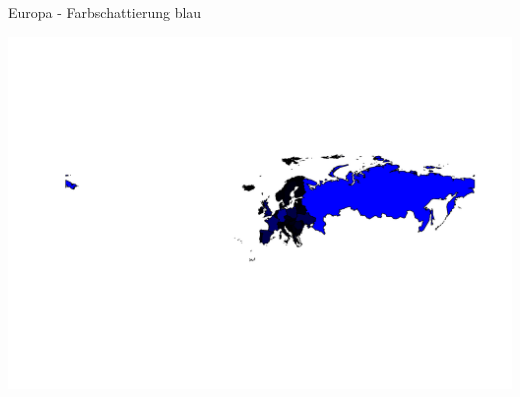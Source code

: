 \documentclass[ignorenonframetext,]{beamer}
\newenvironment{Shaded}{\begin{snugshade}}{\end{snugshade}}
\newcommand{\DataTypeTok}[1]{\textcolor[rgb]{0.74,0.68,0.62}{\underline{#1}}}
\newcommand{\DecValTok}[1]{\textcolor[rgb]{0.27,0.67,0.26}{#1}}
\newcommand{\KeywordTok}[1]{\textcolor[rgb]{0.26,0.66,0.93}{\textbf{#1}}}
\newcommand{\NormalTok}[1]{\textcolor[rgb]{0.74,0.68,0.62}{#1}}
\newcommand{\OperatorTok}[1]{\textcolor[rgb]{0.74,0.68,0.62}{#1}}
\newcommand{\StringTok}[1]{\textcolor[rgb]{0.02,0.61,0.04}{#1}}
\begin{document}
\begin{frame}[fragile]{Europa - Farbschattierung blau}
\protect\hypertarget{europa---farbschattierung-blau}{}

\begin{Shaded}
\end{Shaded}

\includegraphics{Geomedizin_files/figure-beamer/unnamed-chunk-79-1.pdf}

\end{frame}
\end{document}
